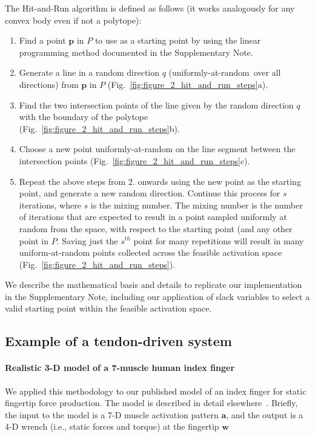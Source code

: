 \documentclass[letterpaper]{article}
\begin{document}
The Hit-and-Run algorithm is defined as follows (it works analogously for any convex body even if not a polytope)\cite{lovasz1999hit}:
\begin{enumerate}
\item Find a point $\textbf{p}$ in $P$ to use as a starting point by using the linear programming method documented in the Supplementary Note.
\item Generate a line in a random direction $q$ (uniformly-at-random\ over all directions) from $\textbf{p}$ in $P$ (Fig.~\ref{fig:figure_2_hit_and_run_steps}a).
\item Find the two intersection points of the line given by the random direction $q$ with the boundary of the polytope (Fig.~\ref{fig:figure_2_hit_and_run_steps}b).
\item Choose a new point uniformly-at-random on the line segment between the intersection points (Fig.~\ref{fig:figure_2_hit_and_run_steps}c).
\item Repeat the above steps from $2.$ onwards using the new point as the starting point, and generate a new random direction.
Continue this process for $s$ iterations, where $s$ is the mixing number. The mixing number is the number of iterations that are expected to result in a point sampled uniformly at random from the space, with respect to the starting point (and any other point in $P$. Saving just the $s^{th}$ point for many repetitions will result in many uniform-at-random points collected across the feasible activation space (Fig.~\ref{fig:figure_2_hit_and_run_steps}).
\end{enumerate}

We describe the mathematical basis and details to replicate our implementation in the Supplementary Note, including our application of slack variables to select a valid starting point within the feasible activation space.

\subsection*{Example of a tendon-driven system}
\paragraph*{Realistic 3-D model of a 7-muscle human index finger}
\label{ss:finger}
We applied this methodology to our published model of an index finger for static fingertip force production.
The model is described in detail elsewhere~\cite{valero-cuevas2009computational}.
Briefly, the input to the model is a 7-D muscle activation pattern $\textbf{a}$, and the output is a 4-D wrench (i.e., static forces and torque) at the fingertip $\textbf{w}$
\end{document}

